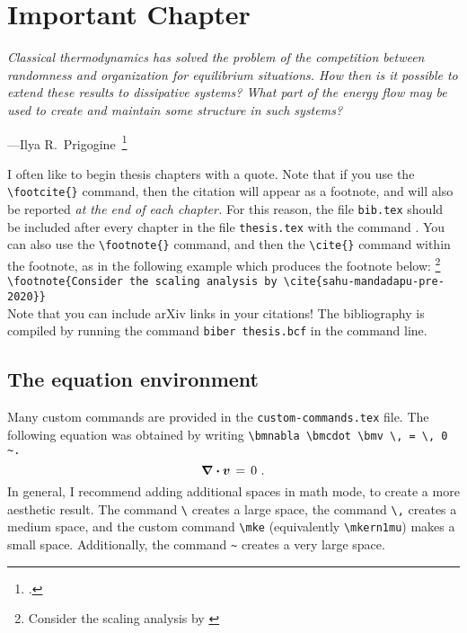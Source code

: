 


%
%

\chapter{Important Chapter} \label{chap_important}
\setcounter{footnote}{0}

\begin{displayquote}
	\selectfont
	\textit{%
		Classical thermodynamics has solved the problem of the competition
		between randomness and organization for equilibrium situations.
		How then is it possible to extend these results to dissipative systems?
		What part of the energy flow may be used to create and maintain some
		structure in such systems?
	}\\
	\rule{0mm}{1pt}\hfill---Ilya R.\ Prigogine~\footcite{prigogine}
\end{displayquote}

I often like to begin thesis chapters with a quote.
Note that if you use the \verb+\footcite{}+ command, then the citation will appear as a footnote, and will also be reported \textit{at the end of each chapter.}
For this reason, the file \verb+bib.tex+ should be included after every chapter in the file \verb+thesis.tex+ with the command \verb++.
You can also use the \verb+\footnote{}+ command, and then the \verb+\cite{}+ command within the footnote, as in the following example which produces the footnote below:%
\footnote{Consider the scaling analysis by \cite{sahu-mandadapu-pre-2020}}
\\[8pt]
\verb+\footnote{Consider the scaling analysis by \cite{sahu-mandadapu-pre-2020}}+
\\[8pt]
Note that you can include arXiv links in your citations!
The bibliography is compiled by running the command \verb+biber thesis.bcf+ in the command line.



%
%

\section{The equation environment} \label{sec_equation_environment}

Many custom commands are provided in the \verb+custom-commands.tex+ file.
The following equation was obtained by writing
\verb+\bmnabla \bmcdot \bmv \, = \, 0 ~.+
\begin{equation}
	\bm{\nabla} \bm{\cdot} \bm{v}
	\, = \, 0
	~.
\end{equation}
In general, I recommend adding additional spaces in math mode, to create a more aesthetic result.
The command \verb+\+ creates a large space, the command \verb+\,+ creates a medium space, and the custom command \verb+\mke+ (equivalently \verb+\mkern1mu+) makes a small space.
Additionally, the command \verb+~+ creates a very large space.



